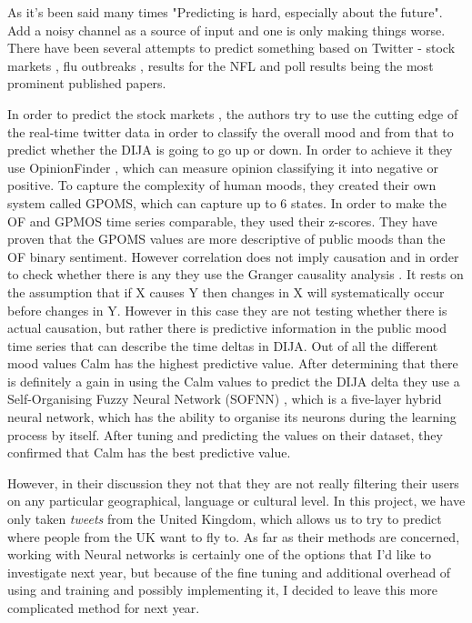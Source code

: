 \documentclass[minf,frontabs,twoside,singlespacing,parskip]{infthesis}
\begin{document}
As it's been said many times "Predicting is hard, especially about the future".  Add a noisy channel as a source of input and one is only making things worse. There have been several attempts to predict something based on Twitter - stock markets \cite{twitstock},  flu outbreaks \cite{twitflu}, results for the NFL \cite{twitnfl} and poll results \cite{twitpoll} being the most prominent published papers.


In order to predict the stock markets \cite{twitstock}, the authors try to use the cutting edge of the real-time twitter data in order to classify the overall mood and from that to predict whether the DIJA \cite{dija} is going to go up or down. In order to achieve it they use OpinionFinder \cite{opfind}, which can measure opinion classifying it into negative or positive. To capture the complexity of human moods, they created their own system called GPOMS, which can capture up to 6 states. 
In order to make the OF and GPMOS time series comparable, they used their z-scores. They have proven that the GPOMS values are more descriptive of public moods than the OF binary sentiment. However correlation does not imply causation and in order to check whether there is any they use the Granger causality analysis \cite{granger}. It rests on the assumption that if X causes Y then changes in X will systematically occur before changes in Y. However in this case they are not testing whether there is actual causation, but rather there is predictive information in the public mood time series that can describe the time deltas in DIJA. Out of all the different mood values Calm has the highest predictive value. After determining that there is definitely a gain in using the Calm values to predict the DIJA delta they use a Self-Organising Fuzzy Neural Network (SOFNN) \cite{sofnn}, which is a five-layer hybrid neural network, which has the ability to organise its neurons during the learning process by itself. After tuning and predicting the values on their dataset, they confirmed that Calm has the best predictive value. 

However, in their discussion they not that they are not really filtering their users on any particular geographical, language or cultural level. In this project, we have only taken \emph{tweets} from the United Kingdom, which allows us to try to predict where people from the UK want to fly to. As far as their methods are concerned, working with Neural networks is certainly one of the options that I'd like to investigate next year, but because of the fine tuning and additional overhead of using and training and possibly implementing it, I decided to leave this more complicated method for next year. 
\end{document}
